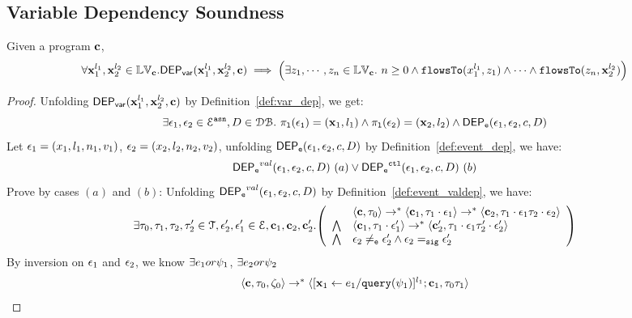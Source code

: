 
\clearpage
\subsection{Variable Dependency Soundness}
\begin{thm}
Given a program ${\boldsymbol{\mathbf{c}}}$, 
\[
  \forall {\boldsymbol{\mathbf{x}}}_1^{l_1}, {\boldsymbol{\mathbf{x}}}_2^{l_2} \in \mathbb{LV}_{{\boldsymbol{\mathbf{c}}}}.
  \mathsf{DEP_{var}}({\boldsymbol{\mathbf{x}}}_1^{l_1}, {\boldsymbol{\mathbf{x}}}_2^{l_2}, {\boldsymbol{\mathbf{c}}})
  \implies 
  \Big( \exists z_1, \cdots, z_n \in \mathbb{LV}_{{\boldsymbol{\mathbf{c}}}}. ~ n \geq 0 \land
  \mathtt{flowsTo}(x_1^{l_1}, z_1) 
  \land \cdots \land \mathtt{flowsTo}(z_n, {\boldsymbol{\mathbf{x}}}_2^{l_2}) \Big)
\]
\end{thm}
\begin{proof}
Unfolding $\mathsf{DEP_{var}}({\boldsymbol{\mathbf{x}}}_1^{l_1}, {\boldsymbol{\mathbf{x}}}_2^{l_2}, {\boldsymbol{\mathbf{c}}})$ by Definition~\ref{def:var_dep},
we get:
\[
\exists \mathtt{\epsilon}_1, \mathtt{\epsilon}_2 \in \mathcal{E}^{\mathtt{{asn}}}, D \in \mathcal{DB}. ~
\mathtt{\pi_{l}(\mathtt{\epsilon}_1)} = ({\boldsymbol{\mathbf{x}}}_1, l_1)
\land
\mathtt{\pi_{l}(\mathtt{\epsilon}_2)} = ({\boldsymbol{\mathbf{x}}}_2, l_2)
\land 
\mathsf{DEP_{\mathtt{e}}}(\mathtt{\epsilon}_1, \mathtt{\epsilon}_2, c, D)
\]
%
Let $\mathtt{\epsilon}_1 = (x_1, l_1, n_1, v_1)$, $\mathtt{\epsilon}_2 = (x_2, l_2, n_2, v_2)$, unfolding $\mathsf{DEP_{\mathtt{e}}}(\mathtt{\epsilon}_1, \mathtt{\epsilon}_2, c, D)$ by Definition~\ref{def:event_dep}, we have:
\[
\mathsf{DEP_{\mathtt{e}}}^{val}(\mathtt{\epsilon}_1, \mathtt{\epsilon}_2, c, D) ~ (a) 
\lor
\mathsf{DEP_{\mathtt{e}}}^{\mathtt{{ctl}}}(\mathtt{\epsilon}_1, \mathtt{\epsilon}_2, c, D) ~ (b)
\]
Prove by cases $(a)$ and $(b)$:
Unfolding $\mathsf{DEP_{\mathtt{e}}}^{val}(\mathtt{\epsilon}_1, \mathtt{\epsilon}_2, c, D)$ by Definition~\ref{def:event_valdep}, we have:
\[
\exists \vtrace_0,
\vtrace_1, \vtrace_2, \vtrace_2' \in \mathcal{T}, \event_2', \event_1' \in \eventset, \ssa{c}_1, \ssa{c}_2,  \ssa{c}_2'.
  \left(
  \begin{array}{ll}   
 & \config{\ssa{c}, \vtrace_0} \rightarrow^{*} 
\config{\ssa{c}_1, \vtrace_1 \cdot \event_1}  \rightarrow^{*} 
  \config{\ssa{c}_2,  \vtrace_1 \cdot \event_1 \vtrace_2 \cdot \event_2 } 
 \\ 
 \bigwedge &
  \config{\ssa{c}_1, \vtrace_1 \cdot \event_1'}  \rightarrow^{*} 
  \config{\ssa{c}_2',  \vtrace_1 \cdot \event_1 \vtrace_2' \cdot \event_2' } 
\\
\bigwedge &
\event_2 \eventneq \event_2' \land \event_2 \sigeq \event_2'
\end{array}
\right)
 \]
 By inversion  on 
 $\mathtt{\epsilon}_1$ and $\mathtt{\epsilon}_2$, we know $\exists e_1 or \psi_1$, $\exists e_2 or \psi_2$
 \[
  \begin{array}{l}   
\langle {\boldsymbol{\mathbf{c}}}, \mathtt{\tau}_0, \mathtt{\zeta}_0 \rangle \rightarrow^{*} 
\langle [\mathrel{ {\boldsymbol{\mathbf{x}}}_1 \leftarrow e_1 / {\tt query}(\psi_1) }]^{l_1} ; {\boldsymbol{\mathbf{c}}}_1, \mathtt{\tau}_0 \mathtt{\tau}_1 \rangle  

\end{array}\]
\end{proof}
